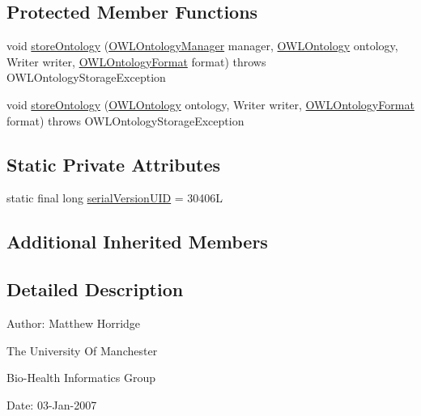 \subsection*{Protected Member Functions}
\begin{DoxyCompactItemize}
\item 
void \hyperlink{classorg_1_1coode_1_1owlapi_1_1rdf_1_1rdfxml_1_1_r_d_f_x_m_l_ontology_storer_ad1af2510370a506d8cf38156f5dd18be}{store\-Ontology} (\hyperlink{interfaceorg_1_1semanticweb_1_1owlapi_1_1model_1_1_o_w_l_ontology_manager}{O\-W\-L\-Ontology\-Manager} manager, \hyperlink{interfaceorg_1_1semanticweb_1_1owlapi_1_1model_1_1_o_w_l_ontology}{O\-W\-L\-Ontology} ontology, Writer writer, \hyperlink{classorg_1_1semanticweb_1_1owlapi_1_1model_1_1_o_w_l_ontology_format}{O\-W\-L\-Ontology\-Format} format)  throws O\-W\-L\-Ontology\-Storage\-Exception 
\item 
void \hyperlink{classorg_1_1coode_1_1owlapi_1_1rdf_1_1rdfxml_1_1_r_d_f_x_m_l_ontology_storer_a7693903251ff5c8a3b1ea294997caba2}{store\-Ontology} (\hyperlink{interfaceorg_1_1semanticweb_1_1owlapi_1_1model_1_1_o_w_l_ontology}{O\-W\-L\-Ontology} ontology, Writer writer, \hyperlink{classorg_1_1semanticweb_1_1owlapi_1_1model_1_1_o_w_l_ontology_format}{O\-W\-L\-Ontology\-Format} format)  throws O\-W\-L\-Ontology\-Storage\-Exception 
\end{DoxyCompactItemize}
\subsection*{Static Private Attributes}
\begin{DoxyCompactItemize}
\item 
static final long \hyperlink{classorg_1_1coode_1_1owlapi_1_1rdf_1_1rdfxml_1_1_r_d_f_x_m_l_ontology_storer_a1055e22709665d7210f3565abfc41e9d}{serial\-Version\-U\-I\-D} = 30406\-L
\end{DoxyCompactItemize}
\subsection*{Additional Inherited Members}


\subsection{Detailed Description}
Author\-: Matthew Horridge\par
 The University Of Manchester\par
 Bio-\/\-Health Informatics Group\par
 Date\-: 03-\/\-Jan-\/2007\par
\par
 

